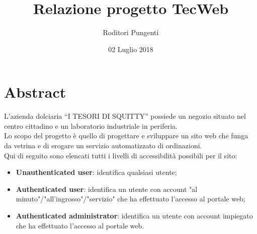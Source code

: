 



\title{\textbf{Relazione progetto TecWeb}}
\author{Roditori Pungenti}

\date{02 Luglio 2018}




\makeFrontPage

\tableofcontents

\newpage

\section{Abstract}

L’azienda dolciaria “I TESORI DI SQUITTY” possiede un negozio situato nel centro cittadino e un laboratorio industriale in periferia.\\
Lo scopo del progetto è quello di progettare e sviluppare un sito web che funga da vetrina e di erogare un servizio automatizzato di ordinazioni.\\

Qui di seguito sono elencati tutti i livelli di accessibilità possibili per il sito:
\begin{itemize}
	\item \textbf{Unauthenticated user}: identifica qualsiasi utente;
	\item \textbf{Authenticated user}: identifica un utente con account "al minuto"/"all'ingrosso"/"servizio" che ha effettuato l'accesso al portale web;
	\item \textbf{Authenticated administrator}: identifica un utente con account impiegato che ha effettuato l'accesso al portale web.
\end{itemize}

